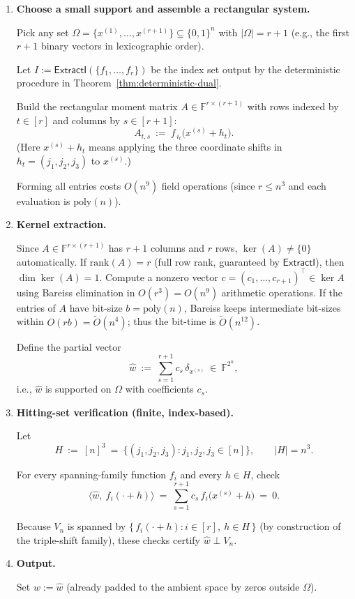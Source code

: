 \documentclass[12pt]{article}
\theoremstyle{definition}
\theoremstyle{definition}
\theoremstyle{remark}
\theoremstyle{remark}
\begin{document}
\begin{enumerate}
\item \textbf{Choose a small support and assemble a rectangular system.}

Pick any set $\Omega = \{x^{(1)},\dots,x^{(r+1)}\}\subseteq \{0,1\}^n$ with $|\Omega|=r+1$ (e.g., the first $r+1$ binary vectors in lexicographic order).

Let $I := \mathsf{ExtractI}(\{f_1,\dots,f_r\})$ be the index set output by the deterministic procedure in Theorem~\ref{thm:deterministic-dual}.

Build the rectangular moment matrix $A\in\mathbb{F}^{r\times (r+1)}$ with rows indexed by $t\in[r]$ and columns by $s\in[r+1]$:
\[
A_{t,s} \ :=\ f_{\,i_t}\!\bigl(x^{(s)}+h_t\bigr).
\]
(Here $x^{(s)}+h_t$ means applying the three coordinate shifts in $h_t=(j_1,j_2,j_3)$ to $x^{(s)}$.)

Forming all entries costs $O(n^9)$ field operations (since $r\le n^3$ and each evaluation is $\mathrm{poly}(n)$).

\item \textbf{Kernel extraction.}

Since $A\in\mathbb{F}^{r\times(r+1)}$ has $r+1$ columns and $r$ rows, $\ker(A)\neq\{0\}$ automatically. If $\mathrm{rank}(A)=r$ (full row rank, guaranteed by $\mathsf{ExtractI}$), then $\dim\ker(A)=1$. Compute a nonzero vector $c=(c_1,\dots,c_{r+1})^\top\in\ker A$ using Bareiss elimination in $O(r^3)=O(n^9)$ arithmetic operations. If the entries of $A$ have bit-size $b=\mathrm{poly}(n)$, Bareiss keeps intermediate bit-sizes within $O(rb)=\tilde O(n^4)$; thus the bit-time is $\tilde O(n^{12})$.

Define the partial vector
\[
\hat w \ :=\ \sum_{s=1}^{r+1} c_s\,\delta_{x^{(s)}} \ \in\ \mathbb{F}^{2^n},
\]
i.e., $\hat w$ is supported on $\Omega$ with coefficients $c_s$.

\item \textbf{Hitting-set verification (finite, index-based).}

Let
\[
H \ :=\ [n]^3 \ =\ \{(j_1,j_2,j_3): j_1,j_2,j_3\in[n]\}, \qquad |H|=n^3.
\]

For every spanning-family function $f_i$ and every $h\in H$, check
\[
\langle \hat w,\ f_i(\cdot+h)\rangle \ =\ \sum_{s=1}^{r+1} c_s\, f_i\bigl(x^{(s)}+h\bigr) \ =\ 0.
\]

Because $V_n$ is spanned by $\{\,f_i(\cdot+h): i\in[r],\ h\in H\,\}$ (by construction of the triple-shift family), these checks certify $\hat w\perp V_n$.

\item \textbf{Output.}

Set $w:=\hat w$ (already padded to the ambient space by zeros outside $\Omega$).
\end{enumerate}
\end{document}
